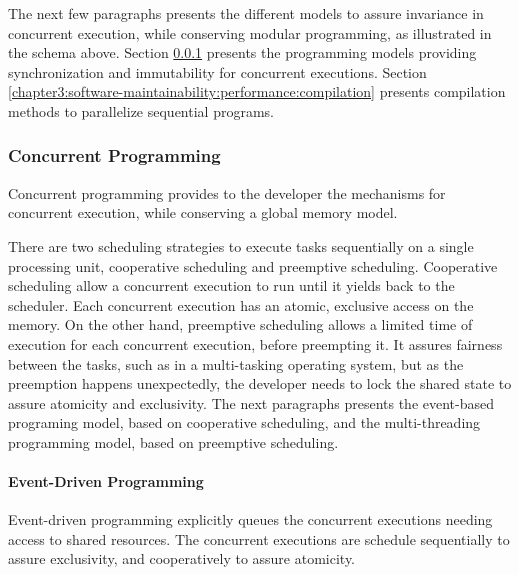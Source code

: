 The next few paragraphs presents the different models to assure invariance in concurrent execution, while conserving modular programming, as illustrated in the schema above.
Section \ref{chapter3:software-maintainability:performance:concurrent-programming} presents the programming models providing synchronization and immutability for concurrent executions.
Section \ref{chapter3:software-maintainability:performance:compilation} presents compilation methods to parallelize sequential programs.


\subsubsection{Concurrent Programming} \label{chapter3:software-maintainability:performance:concurrent-programming}


Concurrent programming provides to the developer the mechanisms for concurrent execution, while conserving a global memory model.


There are two scheduling strategies to execute tasks sequentially on a single processing unit, cooperative scheduling and preemptive scheduling.
Cooperative scheduling allow a concurrent execution to run until it yields back to the scheduler.
Each concurrent execution has an atomic, exclusive access on the memory.
On the other hand, preemptive scheduling allows a limited time of execution for each concurrent execution, before preempting it.
It assures fairness between the tasks, such as in a multi-tasking operating system, but as the preemption happens unexpectedly, the developer needs to lock the shared state to assure atomicity and exclusivity.
The next paragraphs presents the event-based programing model, based on cooperative scheduling, and the multi-threading programming model, based on preemptive scheduling.

\paragraph{Event-Driven Programming}

Event-driven programming explicitly queues the concurrent executions needing access to shared resources.
The concurrent executions are schedule sequentially to assure exclusivity, and cooperatively to assure atomicity.

